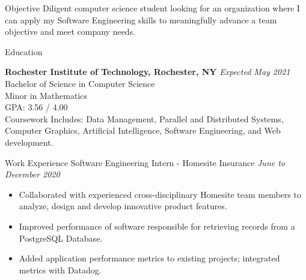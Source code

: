 \documentclass{resume} %
\begin{document}

\begin{rSection}{Objective}
Diligent computer science student looking for an organization where I can apply my Software Engineering skills to
 meaningfully advance a team objective and meet company needs. 
\end{rSection}

\begin{rSection}{Education}

{\bf Rochester Institute of Technology, Rochester, NY} \hfill {\em Expected May 2021} 
\\ Bachelor of Science in Computer Science
\\ Minor in Mathematics
\\ GPA: 3.56 / 4.00
\\ Coursework Includes:  Data Management, Parallel and Distributed Systems, Computer Graphics, Artificial Intelligence, Software Engineering, and Web development.

\end{rSection}


\begin{rSection}{Work Experience} 
Software Engineering Intern - Homesite Insurance \hfill {\em June to December 2020}
\begin{itemize}[noitemsep]
    \item Collaborated with experienced cross-disciplinary Homesite team members to analyze, design and develop innovative product features.
    \item Improved performance of software responsible for retrieving records from a PostgreSQL Database. 
    \item Added application performance metrics to existing projects; integrated metrics with Datadog.
\end{itemize}
\end{rSection}
\end{document}
